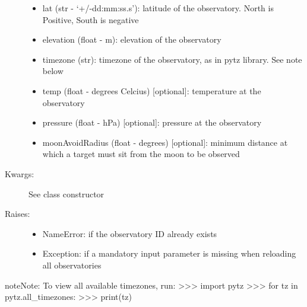 \documentclass[letterpaper,10pt,english]{sphinxmanual}
\begin{document}
\begin{fulllineitems}
\begin{fulllineitems}
\begin{description}
\begin{itemize}
\item {} 
lat (str - `+/-dd:mm:ss.s'): latitude of the observatory. North is Positive, South is negative

\item {} 
elevation (float - m): elevation of the observatory

\item {} 
timezone (str): timezone of the observatory, as in pytz library. See note below

\item {} 
temp (float - degrees Celcius) {[}optional{]}: temperature at the observatory

\item {} 
pressure (float - hPa) {[}optional{]}: pressure at the observatory

\item {} 
moonAvoidRadius (float - degrees) {[}optional{]}: minimum distance at which a target must sit from the moon to be observed

\end{itemize}

\item[{Kwargs:}] \leavevmode
See class constructor

\item[{Raises:}] \leavevmode\begin{itemize}
\item {} 
NameError: if the observatory ID already exists

\item {} 
Exception: if a mandatory input parameter is missing when reloading all observatories

\end{itemize}

\end{description}

\begin{notice}{note}{Note:}
To view all available timezones, run:
\textgreater{}\textgreater{}\textgreater{} import pytz
\textgreater{}\textgreater{}\textgreater{} for tz in pytz.all\_timezones:
\textgreater{}\textgreater{}\textgreater{}     print(tz)
\end{notice}

\end{fulllineitems}



\end{fulllineitems}
\end{document}
